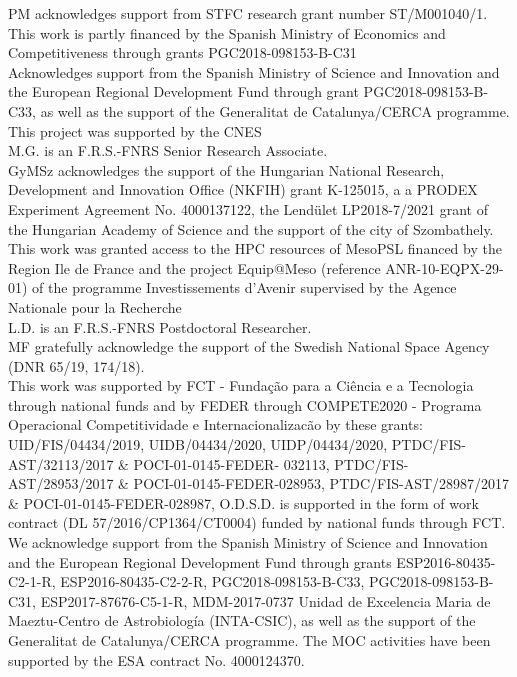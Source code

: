 PM acknowledges support from STFC research grant number ST/M001040/1.\\ %
This work is partly financed by the Spanish Ministry of Economics and Competitiveness through grants PGC2018-098153-B-C31\\ %
Acknowledges support from the Spanish Ministry of Science and Innovation and the European Regional Development Fund through grant PGC2018-098153-B- C33, as well as the support of the Generalitat de Catalunya/CERCA programme.\\ %
This project was supported by the CNES\\ %
M.G. is an F.R.S.-FNRS Senior Research Associate.\\ %
GyMSz acknowledges the support of the Hungarian National Research, Development and Innovation Office (NKFIH) grant K-125015, a a PRODEX Experiment Agreement No. 4000137122, the Lend\"ulet LP2018-7/2021 grant of the Hungarian Academy of Science and the support of the city of Szombathely.\\ %
This work was granted access to the HPC resources of MesoPSL financed by the Region Ile de France and the project Equip@Meso (reference ANR-10-EQPX-29-01) of the programme Investissements d'Avenir supervised by the Agence Nationale pour la Recherche\\ %
L.D. is an F.R.S.-FNRS Postdoctoral Researcher.\\ %
MF gratefully acknowledge the support of the Swedish National Space Agency (DNR 65/19, 174/18).\\ %
This work was supported by FCT - Fundação para a Ciência e a Tecnologia through national funds and by FEDER through COMPETE2020 - Programa Operacional Competitividade e Internacionalizacão by these grants: UID/FIS/04434/2019, UIDB/04434/2020, UIDP/04434/2020, PTDC/FIS-AST/32113/2017 \& POCI-01-0145-FEDER- 032113, PTDC/FIS-AST/28953/2017 \& POCI-01-0145-FEDER-028953, PTDC/FIS-AST/28987/2017 \& POCI-01-0145-FEDER-028987, O.D.S.D. is supported in the form of work contract (DL 57/2016/CP1364/CT0004) funded by national funds through FCT.\\ %
We acknowledge support from the Spanish Ministry of Science and Innovation and the European Regional Development Fund through grants ESP2016-80435-C2-1-R, ESP2016-80435-C2-2-R, PGC2018-098153-B-C33, PGC2018-098153-B-C31, ESP2017-87676-C5-1-R, MDM-2017-0737 Unidad de Excelencia Maria de Maeztu-Centro de Astrobiologí­a (INTA-CSIC), as well as the support of the Generalitat de Catalunya/CERCA programme. The MOC activities have been supported by the ESA contract No. 4000124370.\\ %
